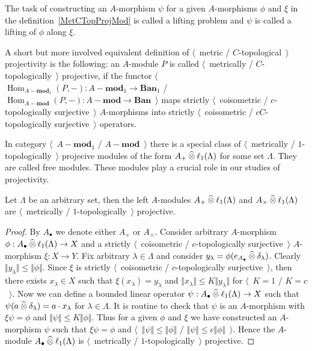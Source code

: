 The task of constructing an $A$-morphism $\psi$ for a given $A$-morphisms $\phi$ 
and $\xi$ in the definition~\ref{MetCTopProjMod} is called a lifting problem 
and $\psi$ is called a lifting of $\phi$ along $\xi$.

A short but more involved equivalent definition 
of $\langle$~metric / $C$-topological~$\rangle$ projectivity is the following: 
an $A$-module $P$ is called $\langle$~metrically / $C$-topologically~$\rangle$ 
projective, if the functor
$\langle$~$\operatorname{Hom}_{A-\mathbf{mod}_1}(P,-)
:A-\mathbf{mod}_1\to\mathbf{Ban}_1$
/
$\operatorname{Hom}_{A-\mathbf{mod}}(P,-)
:A-\mathbf{mod}\to\mathbf{Ban}$~$\rangle$
maps strictly $\langle$~coisometric / $c$-topologically surjective~$\rangle$
$A$-morphisms into strictly $\langle$~coisometric / 
$c C$-topologically surjective~$\rangle$ operators. 

In category $\langle$~$A-\mathbf{mod}_1$ / $A-\mathbf{mod}$~$\rangle$ there
is a special class of $\langle$~metrically / $1$-topologically~$\rangle$
projecive modules of the form $A_+\mathbin{\widehat{\otimes}} \ell_1(\Lambda)$ for 
some set $\Lambda$. They are called free modules. These modules play a crucial 
role in our studies of projectivity.

\begin{proposition}\label{MetCTopFreeMod} Let $\Lambda$ be an arbitrary 
set, then the left $A$-modules $A_+ \mathbin{\widehat{\otimes}} \ell_1(\Lambda)$ 
and $A_\times \mathbin{\widehat{\otimes}} \ell_1(\Lambda)$ 
are $\langle$~metrically / $1$-topologically~$\rangle$ projective. 
\end{proposition}
\begin{proof} By $A_\bullet$ we denote either $A_+$ or $A_\times$. 
Consider arbitrary $A$-morphism 
$\phi:A_\bullet\mathbin{\widehat{\otimes}}\ell_1(\Lambda)\to X$ and a 
strictly $\langle$~coisometric / $c$-topologically surjective~$\rangle$ 
$A$-morphism $\xi:X\to Y$. Fix arbitrary $\lambda\in\Lambda$ and 
consider $y_\lambda=\phi(e_{A_\bullet}\mathbin{\widehat{\otimes}} \delta_\lambda)$. 
Clearly $\Vert y_\lambda\Vert\leq \Vert\phi\Vert$. Since $\xi$ is 
strictly $\langle$~coisometric / $c$-topologically surjective~$\rangle$, 
then there exists $x_\lambda\in X$ such that $\xi(x_\lambda)=y_\lambda$
and $\Vert x_\lambda\Vert\leq K\Vert y_\lambda\Vert$ for $\langle$~$K=1$ / 
$K=c$~$\rangle$. Now we can define a bounded linear operator
$\psi:A_\bullet\mathbin{\widehat{\otimes}} \ell_1(\Lambda)\to X$ such that 
$\psi(a\mathbin{\widehat{\otimes}} \delta_\lambda)=a\cdot x_\lambda$ for $\lambda\in\Lambda$. 
It is routine to check that $\psi$ is an $A$-morphism with $\xi\psi=\phi$ 
and $\Vert\psi\Vert\leq K\Vert\phi\Vert$. Thus for a given $\phi$ and $\xi$
we have constructed an $A$-morphism $\psi$ such that $\xi\psi=\phi$ and
$\langle$~$\Vert\psi\Vert\leq \Vert\phi\Vert$ / $\Vert\psi\Vert\leq
c\Vert\phi\Vert$~$\rangle$. Hence the $A$-module $A_\bullet\mathbin{\widehat{\otimes}}
\ell_1(\Lambda)$ is $\langle$~metrically / $1$-topologically~$\rangle$
projective.
\end{proof}


